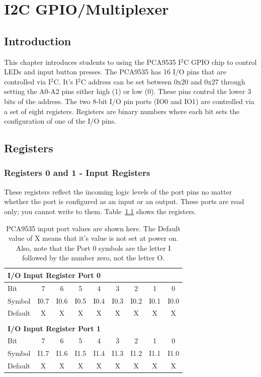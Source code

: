 \chapter{I2C GPIO/Multiplexer}

\section{Introduction}
This chapter introduces students to using the PCA9535 I$^2$C GPIO chip to control LEDs and input button 
presses. The PCA9535 has 16 I/O pins that are controlled via I$^2$C. It's I$^2$C address can be set 
between 0x20 and 0x27 through setting the A0-A2 pins either high (1) or low (0). These pins control 
the lower 3 bits of the address. The two 8-bit I/O pin ports (IO0 and IO1) are controlled via a set of 
eight registers. Registers are binary numbers where each bit sets the configuration of one of the I/O pins.

\section{Registers}
\subsection{Registers 0 and 1 - Input Registers}
These registers reflect the incoming logic levels of the port pins no matter whether the port is 
configured as an input or an output. These ports are read only; you cannot write to them. 
Table~\ref{table:pca9535inputports} shows the registers.

\begin{table}[!htb]
	\centering
	\begin{tabular}{l c c c c c c c c}
        \multicolumn{5}{l}{\textbf{I/O Input Register Port 0}} \\
		\hline
		Bit & 7 & 6 & 5 & 4 & 3 & 2 & 1 & 0 \\
		\hline
        Symbol & I0.7 & I0.6 & I0.5 & I0.4 & I0.3 & I0.2 & I0.1 & I0.0\\
        Default & X & X & X & X & X & X & X & X \\
        \hline
        \\
        \multicolumn{5}{l}{\textbf{I/O Input Register Port 1}} \\
		\hline
		Bit & 7 & 6 & 5 & 4 & 3 & 2 & 1 & 0 \\
		\hline
        Symbol & I1.7 & I1.6 & I1.5 & I1.4 & I1.3 & I1.2 & I1.1 & I1.0\\
        Default & X & X & X & X & X & X & X & X \\
        \hline
	\end{tabular}
	\caption{PCA9535 input port values are shown here. The Default value of X means 
    that it's value is not set at power on. Also, note that the Port 0 symbols are the 
    letter I followed by the number zero, not the letter O.}
	\label{table:pca9535inputports}
\end{table}


